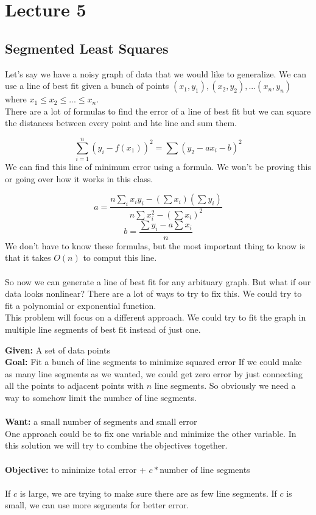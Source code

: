 \documentclass[oneside]{book}
\begin{document}
\chapter{Lecture 5}

\section{Segmented Least Squares}

Let's say we have a noisy graph of data that we would like to generalize. We can use a line of best fit given a bunch of points $(x_1, y_1),(x_2,y_2), ... (x_n, y_n)$ where  $x_1 \leq x_2 \leq ... \leq x_n$.\\
There are a lot of formulas to find the error of a line of best fit but we can square the distances between every point and hte line and sum them.

  {
     $$\sum^n_{i=1} (y_i - f(x_1))^2 = \sum (y_2-ax_i-b)^2$$
}
We can find this line of minimum error using a formula. We won't be proving this or going over how it works in this class.

 {
   $$ a = \frac{n \sum_ix_iy_i-(\sum x_i)(\sum y_i)}{n\sum x_i^2 -(\sum x_i)^2} $$
   $$ b = \frac{\sum y_i - a\sum x_i}{n} $$
}
We don't have to know these formulas, but the most important thing to know is that it takes $O(n)$ to comput this line.
\\\\
So now we can generate a line of best fit for any arbituary graph. But what if our data looks nonlinear? There are a lot of ways to try to fix this. We could try to fit a polynomial or exponential function.\\
This problem will focus on a different approach. We could try to fit the graph in multiple line segments of best fit instead of just one. 

 {
    \textbf{Given: } A set of data points\\
    \textbf{Goal:} Fit a bunch of line segments to minimize squared error
}
If we could make as many line segments as we wanted, we could get zero error by just connecting all the points to adjacent points with $n$ line segments. So obviously we need a way to somehow limit the number of line segments.
\\\\
\textbf{Want: } a small number of segments and small error\\
One approach could be to fix one variable and minimize the other variable. In this solution we will try to combine the objectives together.\\\\
\textbf{Objective: } to minimize total error + $c*$number of line segments
\\\\
If $c$ is large, we are trying to make sure there are as few line segments. If $c$ is small, we can use more segments for better error.
\end{document}
